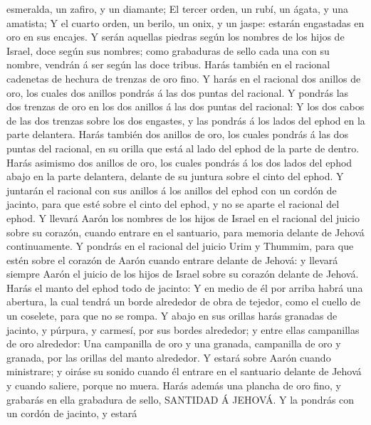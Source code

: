 esmeralda, un zafiro, y un diamante;  El tercer orden, un
rubí, un ágata, y una amatista;  Y el cuarto orden, un
berilo, un onix, y un jaspe: estarán engastadas en oro en sus encajes.
 Y serán aquellas piedras según los nombres de los hijos de
Israel, doce según sus nombres; como grabaduras de sello cada una con su
nombre, vendrán á ser según las doce tribus.  Harás también
en el racional cadenetas de hechura de trenzas de oro fino.
 Y harás en el racional dos anillos de oro, los cuales dos
anillos pondrás á las dos puntas del racional.  Y pondrás
las dos trenzas de oro en los dos anillos á las dos puntas del racional:
 Y los dos cabos de las dos trenzas sobre los dos engastes,
y las pondrás á los lados del ephod en la parte delantera. 
Harás también dos anillos de oro, los cuales pondrás á las dos puntas
del racional, en su orilla que está al lado del ephod de la parte de
dentro.  Harás asimismo dos anillos de oro, los cuales
pondrás á los dos lados del ephod abajo en la parte delantera, delante
de su juntura sobre el cinto del ephod.  Y juntarán el
racional con sus anillos á los anillos del ephod con un cordón de
jacinto, para que esté sobre el cinto del ephod, y no se aparte el
racional del ephod.  Y llevará Aarón los nombres de los
hijos de Israel en el racional del juicio sobre su corazón, cuando
entrare en el santuario, para memoria delante de Jehová continuamente.
 Y pondrás en el racional del juicio Urim y Thummim, para
que estén sobre el corazón de Aarón cuando entrare delante de Jehová: y
llevará siempre Aarón el juicio de los hijos de Israel sobre su corazón
delante de Jehová.  Harás el manto del ephod todo de
jacinto:  Y en medio de él por arriba habrá una abertura,
la cual tendrá un borde alrededor de obra de tejedor, como el cuello de
un coselete, para que no se rompa.  Y abajo en sus orillas
harás granadas de jacinto, y púrpura, y carmesí, por sus bordes
alrededor; y entre ellas campanillas de oro alrededor:  Una
campanilla de oro y una granada, campanilla de oro y granada, por las
orillas del manto alrededor.  Y estará sobre Aarón cuando
ministrare; y oiráse su sonido cuando él entrare en el santuario delante
de Jehová y cuando saliere, porque no muera.  Harás además
una plancha de oro fino, y grabarás en ella grabadura de sello, SANTIDAD
Á JEHOVÁ.  Y la pondrás con un cordón de jacinto, y estará
